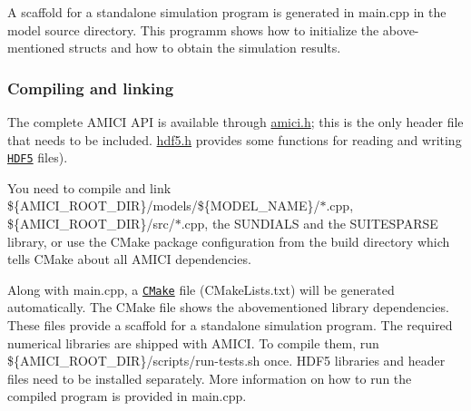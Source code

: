A scaffold for a standalone simulation program is generated in {\ttfamily main.\+cpp} in the model source directory. This programm shows how to initialize the above-\/mentioned structs and how to obtain the simulation results.

\subsubsection*{Compiling and linking}

The complete A\+M\+I\+CI A\+PI is available through {\ttfamily \mbox{\hyperlink{amici_8h_source}{amici.\+h}}}; this is the only header file that needs to be included. {\ttfamily \mbox{\hyperlink{hdf5_8h_source}{hdf5.\+h}}} provides some functions for reading and writing \href{https://support.hdfgroup.org/}{\tt H\+D\+F5} files).

You need to compile and link {\ttfamily \$\{A\+M\+I\+C\+I\+\_\+\+R\+O\+O\+T\+\_\+\+D\+IR\}/models/\$\{M\+O\+D\+E\+L\+\_\+\+N\+A\+ME\}/$\ast$.cpp}, {\ttfamily \$\{A\+M\+I\+C\+I\+\_\+\+R\+O\+O\+T\+\_\+\+D\+IR\}/src/$\ast$.cpp}, the S\+U\+N\+D\+I\+A\+LS and the S\+U\+I\+T\+E\+S\+P\+A\+R\+SE library, or use the C\+Make package configuration from the build directory which tells C\+Make about all A\+M\+I\+CI dependencies.

Along with {\ttfamily main.\+cpp}, a \href{https://cmake.org/}{\tt C\+Make} file ({\ttfamily C\+Make\+Lists.\+txt}) will be generated automatically. The C\+Make file shows the abovementioned library dependencies. These files provide a scaffold for a standalone simulation program. The required numerical libraries are shipped with A\+M\+I\+CI. To compile them, run {\ttfamily \$\{A\+M\+I\+C\+I\+\_\+\+R\+O\+O\+T\+\_\+\+D\+IR\}/scripts/run-\/tests.sh} once. H\+D\+F5 libraries and header files need to be installed separately. More information on how to run the compiled program is provided in {\ttfamily main.\+cpp}. 